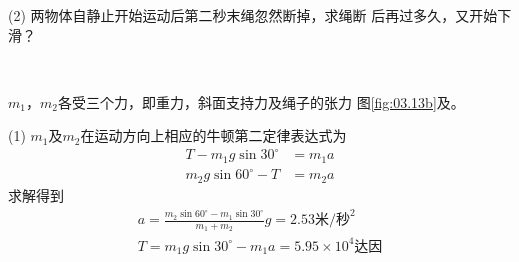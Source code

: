 (2) 两物体自静止开始运动后第二秒末绳忽然断掉，求绳断
后再过多久，又开始下滑？
\begin{figurex}
    \centering
    \\[-0.5em]
     \qquad
    \caption{}
    \label{fig:03.13}
\end{figurex}

\solution $m_1$，$m_2$各受三个力，即重力，斜面支持力及绳子的张力
\lhbrak 图\ref{fig:03.13b}及\rhbrak。

(1) $m_1$及$m_2$在运动方向上相应的牛顿第二定律表达式为
\begin{align*}
	T - m _ { 1 } g \sin 3 0 ^ { \circ } &= m _ { 1 } a \\[-0.5em]
	m _ { 2 } g \sin 6 0 ^ { \circ } - T &= m _ { 2 } a
\end{align*}
求解得到
\begin{align*}
	a = \frac { m _ { 2 } \sin 6 0 ^ { \circ } - m _ { 1 } \sin 3 0 ^ { \circ } } { m _ { 1 } + m _ { 2 } } g = 2 . 5 3 \text{米/秒}^2 \\[-0.5em]
	T = m _ { 1 } g \sin 3 0 ^ { \circ } - m _ { 1 } a = 5 . 9 5 \times 1 0 ^ { 4 } \text{达因}
\end{align*}

